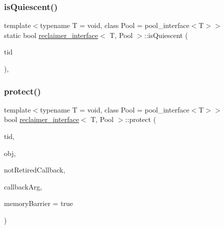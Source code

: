 \subsubsection{\texorpdfstring{is\+Quiescent()}{isQuiescent()}}
{\footnotesize\ttfamily template$<$typename T  = void, class Pool  = pool\+\_\+interface$<$\+T$>$$>$ \\
static bool \hyperlink{classreclaimer__interface}{reclaimer\+\_\+interface}$<$ T, Pool $>$\+::is\+Quiescent (\begin{DoxyParamCaption}\item[{const int}]{tid }\end{DoxyParamCaption})\hspace{0.3cm}{\ttfamily [inline]}, {\ttfamily [static]}}

\mbox{\label{classreclaimer__interface_acdac11080a38f7d5b6e60007d9b620cf}} 
\subsubsection{\texorpdfstring{protect()}{protect()}}
{\footnotesize\ttfamily template$<$typename T  = void, class Pool  = pool\+\_\+interface$<$\+T$>$$>$ \\
bool \hyperlink{classreclaimer__interface}{reclaimer\+\_\+interface}$<$ T, Pool $>$\+::protect (\begin{DoxyParamCaption}\item[{const int}]{tid,  }\item[{T $\ast$}]{obj,  }\item[{\hyperlink{globals_8h_a57f5c0d40b156d7d996492fb2f16e3cd}{Callback\+Type}}]{not\+Retired\+Callback,  }\item[{\hyperlink{globals_8h_a3de64ef48066ac6430631c8b81a15345}{Callback\+Arg}}]{callback\+Arg,  }\item[{bool}]{memory\+Barrier = {\ttfamily true} }\end{DoxyParamCaption})\hspace{0.3cm}{\ttfamily [inline]}}

\mbox{\label{classreclaimer__interface_ae017ea119e3bc36949107124babf3888}} 
